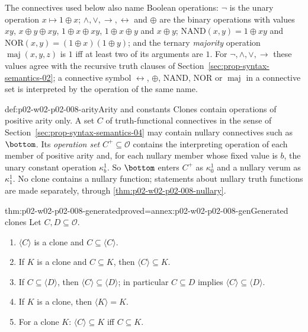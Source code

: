 The connectives used below also name Boolean operations: \(\neg\) is the
unary operation \(x\mapsto1\oplus x\); \(\land,\lor,\to,\leftrightarrow\) and
\(\oplus\) are the binary operations with values \(xy\),
\(x\oplus y\oplus xy\), \(1\oplus x\oplus xy\), \(1\oplus x\oplus y\) and
\(x\oplus y\); \(\mathrm{NAND}(x,y)=1\oplus xy\) and
\(\mathrm{NOR}(x,y)=(1\oplus x)(1\oplus y)\); and the ternary
\emph{majority} operation \(\operatorname{maj}(x,y,z)\) is \(1\) iff at least
two of its arguments are \(1\).  For \(\neg,\land,\lor,\to\) these values
agree with the recursive truth clauses of
Section~\ref{sec:prop-syntax-semantics-02}; a connective symbol
\(\leftrightarrow\), \(\oplus\), \(\mathrm{NAND}\), \(\mathrm{NOR}\) or
\(\operatorname{maj}\) in a connective set is interpreted by the operation of
the same name.

\begin{hbconvention}{def:p02-w02-p02-008-arity}{Arity and constants}
Clones contain operations of positive arity only.  A set \(C\) of
truth-functional connectives in the sense of
Section~\ref{sec:prop-syntax-semantics-04} may contain nullary connectives
such as \(\bottom\).  Its \emph{operation set} \(C^+\subseteq\mathcal O\)
contains the interpreting operation of each member of positive arity and, for
each nullary member whose fixed value is \(b\), the unary constant operation
\(\kappa^1_b\).  So \(\bottom\) enters \(C^+\) as \(\kappa^1_0\) and a
nullary verum as \(\kappa^1_1\).  No clone contains a nullary function;
statements about nullary truth functions are made separately, through
\cref{thm:p02-w02-p02-008-nullary}.
\end{hbconvention}

\begin{hblemma}{thm:p02-w02-p02-008-generated}{proved=annex:p02-w02-p02-008-gen}{Generated clones}
Let \(C,D\subseteq\mathcal O\).
\begin{enumerate}
\item \(\langle C\rangle\) is a clone and \(C\subseteq\langle C\rangle\).
\item If \(K\) is a clone and \(C\subseteq K\), then
  \(\langle C\rangle\subseteq K\).
\item If \(C\subseteq\langle D\rangle\), then
  \(\langle C\rangle\subseteq\langle D\rangle\); in particular
  \(C\subseteq D\) implies \(\langle C\rangle\subseteq\langle D\rangle\).
\item If \(K\) is a clone, then \(\langle K\rangle=K\).
\item For a clone \(K\): \(\langle C\rangle\subseteq K\) iff
  \(C\subseteq K\).
\end{enumerate}
\end{hblemma}

